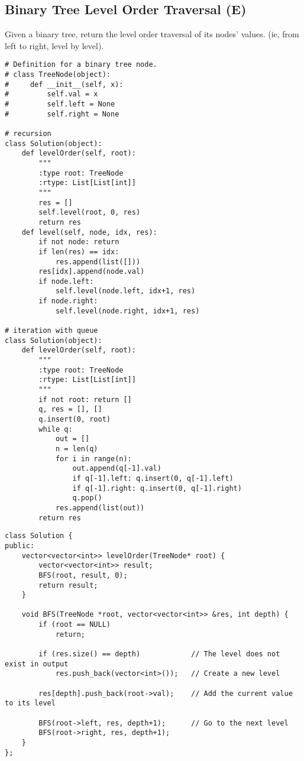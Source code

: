 \subsection{Binary Tree Level Order Traversal (E)}
Given a binary tree, return the level order traversal of its nodes' values. (ie, from left to right, level by level).\\

\begin{lstlisting}
# Definition for a binary tree node.
# class TreeNode(object):
#     def __init__(self, x):
#         self.val = x
#         self.left = None
#         self.right = None

# recursion
class Solution(object):
    def levelOrder(self, root):
        """
        :type root: TreeNode
        :rtype: List[List[int]]
        """
        res = []
        self.level(root, 0, res)
        return res
    def level(self, node, idx, res):
        if not node: return
        if len(res) == idx:
            res.append(list([]))
        res[idx].append(node.val)
        if node.left:
            self.level(node.left, idx+1, res)
        if node.right:
            self.level(node.right, idx+1, res)

# iteration with queue
class Solution(object):
    def levelOrder(self, root):
        """
        :type root: TreeNode
        :rtype: List[List[int]]
        """
        if not root: return []
        q, res = [], []
        q.insert(0, root)
        while q:
            out = []
            n = len(q)
            for i in range(n):
                out.append(q[-1].val)
                if q[-1].left: q.insert(0, q[-1].left)
                if q[-1].right: q.insert(0, q[-1].right)
                q.pop()
            res.append(list(out))
        return res
\end{lstlisting}

\begin{lstlisting}
class Solution {
public:
    vector<vector<int>> levelOrder(TreeNode* root) {
        vector<vector<int>> result;
        BFS(root, result, 0);
        return result;
    }
    
    void BFS(TreeNode *root, vector<vector<int>> &res, int depth) {
        if (root == NULL)
            return;
        
        if (res.size() == depth)            // The level does not exist in output
            res.push_back(vector<int>());   // Create a new level
            
        res[depth].push_back(root->val);    // Add the current value to its level
        
        BFS(root->left, res, depth+1);      // Go to the next level
        BFS(root->right, res, depth+1);
    }
};
\end{lstlisting}


